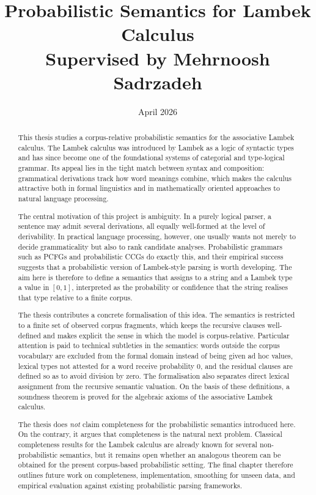\documentclass[12pt,a4paper]{report}
\title{Probabilistic Semantics for Lambek Calculus\\\large Supervised by Mehrnoosh Sadrzadeh}
\author{}
\date{April 2026}
\theoremstyle{definition}
\begin{document}
\hypersetup{pageanchor=false}
\maketitle
\setcounter{page}{2}

\begin{abstract}
This thesis studies a corpus-relative probabilistic semantics for the associative Lambek
calculus. The Lambek calculus was introduced by Lambek as a logic of syntactic types and has
since become one of the foundational systems of categorial and type-logical grammar.
Its appeal lies in the tight match between syntax and composition: grammatical derivations
track how word meanings combine, which makes the calculus attractive both in formal
linguistics and in mathematically oriented approaches to natural language processing.

The central motivation of this project is ambiguity. In a purely logical parser, a sentence may
admit several derivations, all equally well-formed at the level of derivability. In practical
language processing, however, one usually wants not merely to decide grammaticality but also
to rank candidate analyses. Probabilistic grammars such as PCFGs and probabilistic CCGs do
exactly this, and their empirical success suggests that a probabilistic version of Lambek-style
parsing is worth developing. The aim here is therefore to define a semantics that assigns to a
string and a Lambek type a value in $[0,1]$, interpreted as the probability or confidence that
the string realises that type relative to a finite corpus.

The thesis contributes a concrete formalisation of this idea. The semantics is restricted to a
finite set of observed corpus fragments, which keeps the recursive clauses well-defined and makes
explicit the sense in which the model is corpus-relative. Particular attention is paid to technical
subtleties in the semantics: words outside the corpus vocabulary are excluded from the formal
domain instead of being given ad hoc values, lexical types not attested for a word receive
probability $0$, and the residual clauses are defined so as to avoid division by zero. The
formalisation also separates direct lexical assignment from the recursive
semantic valuation. On the basis of these definitions, a soundness theorem is proved for the
algebraic axioms of the associative Lambek calculus.

The thesis does \emph{not} claim completeness for the probabilistic semantics introduced here.
On the contrary, it argues that completeness is the natural next problem. Classical completeness
results for the Lambek calculus are already known for several non-probabilistic semantics, but
it remains open whether an analogous theorem can be obtained for the present corpus-based
probabilistic setting. The final chapter therefore outlines future work on completeness,
implementation, smoothing for unseen data, and empirical evaluation against existing
probabilistic parsing frameworks.
\end{abstract}
\end{document}
